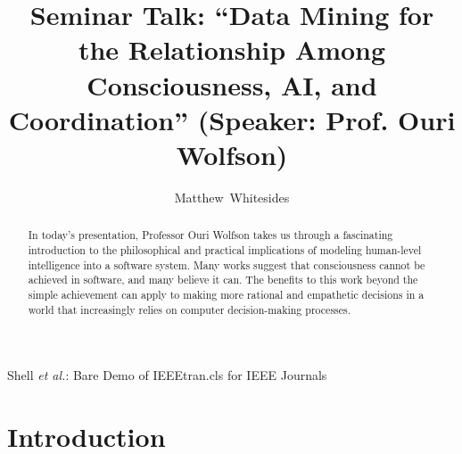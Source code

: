 \documentclass[journal,onecolumn]{IEEEtran}
\begin{document}
%
\title{Seminar Talk: ``Data Mining for the Relationship Among Consciousness, AI, and Coordination'' (Speaker: Prof. Ouri Wolfson)}

%
%
%
\author{Matthew~Whitesides}%

%
{Shell \MakeLowercase{\textit{et al.}}: Bare Demo of IEEEtran.cls for IEEE Journals}

\maketitle

\begin{abstract}
  In today's presentation, Professor Ouri Wolfson takes us through a fascinating introduction to the philosophical and practical implications of modeling human-level intelligence into a software system. Many works suggest that consciousness cannot be achieved in software, and many believe it can. The benefits to this work beyond the simple achievement can apply to making more rational and empathetic decisions in a world that increasingly relies on computer decision-making processes. 
\end{abstract}


\IEEEpeerreviewmaketitle

\section{Introduction}
\end{document}
